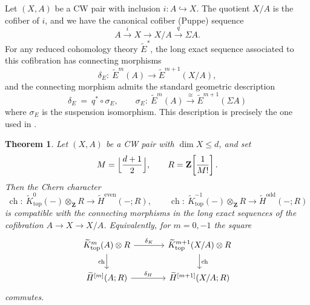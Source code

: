 \documentclass[11pt]{amsart}
\newtheorem{theorem}[lemma]{Theorem}
\numberwithin{equation}{section}
\newcommand{\ch}{{\operatorname{ch}}}
\newcommand{\topp}{{\operatorname{top}}}
\numberwithin{equation}{section}
\begin{document}

Let $(X,A)$ be a CW pair with inclusion $i\colon A\hookrightarrow X$. The quotient $X/A$ is the cofiber of $i$,
and we have the canonical cofiber (Puppe) sequence
\[
A \xrightarrow{\,i\,} X \longrightarrow X/A \xrightarrow{\,q\,} \Sigma A.
\]
For any reduced cohomology theory $\widetilde E^*$, the long exact sequence associated to this cofibration
has connecting morphisms
\[
\delta_E:\ \widetilde E^{m}(A)\longrightarrow \widetilde E^{m+1}(X/A),
\]
and the connecting morphism admits the standard geometric description
\[
\delta_E \ =\ q^{*}\circ \sigma_E,
\qquad
\sigma_E:\ \widetilde E^{m}(A)\xrightarrow{\ \cong\ }\widetilde E^{m+1}(\Sigma A)
\]
where $\sigma_E$ is the suspension isomorphism. This description is precisely the one used in \cite{A62}.

\begin{theorem}\label{chbdy}
Let $(X,A)$ be a CW pair with $\dim X\le d$, and set
\[
M=\Bigl\lfloor\frac{d+1}{2}\Bigr\rfloor,\qquad R=\mathbf{Z}\!\left[\frac{1}{M!}\right].
\]
Then the Chern character
\[
\ch:\ \widetilde{K}_{\topp}^{0}(-)\otimes_{\mathbf{Z}} R \to \widetilde H^{\mathrm{even}}(-;R),
\qquad
\ch:\ \widetilde{K}_{\topp}^{-1}(-)\otimes_{\mathbf{Z}} R \to \widetilde H^{\mathrm{odd}}(-;R)
\]
is compatible with the connecting morphisms in the long exact sequences of the cofibration
$A\to X\to X/A$.
Equivalently, for $m=0,-1$ the square
\[
\begin{tikzcd}[column sep=large]
\widetilde{K}_{\topp}^{m}(A)\otimes R \ar[r,"\delta_K"] \ar[d,"\ch"'] &
\widetilde{K}_{\topp}^{m+1}(X/A)\otimes R \ar[d,"\ch"] \\
\widetilde H^{[m]}(A;R) \ar[r,"\delta_H"] &
\widetilde H^{[m+1]}(X/A;R)
\end{tikzcd}
\]
commutes.
\end{theorem}
\end{document}
